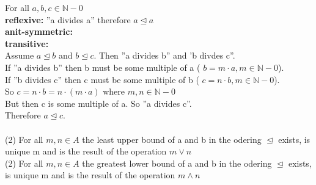 \documentclass[11pt,leqno,fleqn]{article}
\begin{document}
For all $ a,b,c \in \mathbb{N}-{0}$\\
 \textbf{reflexive:}  ''a divides a'' therefore $  a \trianglelefteq a $\\
 \textbf{anit-symmetric:} 
 \\
\textbf{transitive:}\\
Assume $a \trianglelefteq b$ and $b \trianglelefteq c$. Then ''a divides b'' and 'b divdes c''.  \\
If ''a divides b'' then b must be some multiple of a ( $ b = m \cdot  a, m \in \mathbb{N}-{0}$).\\ 
If ''b divides c'' then c must be some multiple of b ( $ c = n \cdot  b, m \in \mathbb{N}-{0}$).\\ 
So $c = n \cdot b = n \cdot (m \cdot a) $ where $m,n \in \mathbb{N}-{0}$\\
But then c is some multiple of a. So ''a divides c''.\\
Therefore $ a \trianglelefteq c$.\\
\\
(2) For all $m,n \in A$ the least upper bound of a and b in the odering $\trianglelefteq$ exists, is unique m and is the result of the operation $m \lor n$\\
(2) For all $m,n \in A$ the greatest lower bound of a and b in the odering $\trianglelefteq$ exists, is unique m and is the result of the operation $m \land n$\\
\end{document}
